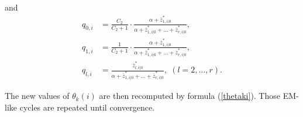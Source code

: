 \documentclass[12pt]{article}
\begin{document}
\begin{appendices}
\noindent
    and
    \begin{align*}
    q_{0,i} &= \frac{C_2}{C_2+1} \cdot \frac{\alpha+\bar{z}_{1,i|0}^*}
      {\alpha + \bar{z}_{1,i|0}^* +
      \ldots + \bar{z}_{r,i|0}^*}, \\
    q_{1,i} &= \frac{1}{C_2+1} \cdot \frac{\alpha+\bar{z}_{1,i|0}^*}
      {\alpha + \bar{z}_{1,i|0}^* +
      \ldots + \bar{z}_{r,i|0}^*}, \\
    q_{l,i} &= \frac{\bar{z}_{l,i|0}^*}{\alpha + \bar{z}_{1,i|0}^* +
      \ldots + \bar{z}_{r,i|0}^*}, \; (l = 2, \ldots, r).
    \end{align*}


    The new values of $\theta_k(i)$ are then recomputed by
    formula (\ref{thetaki}). Those EM-like cycles are repeated
    until convergence.

\end{appendices}
\end{document}
